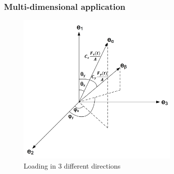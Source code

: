 \documentclass[xcolor=table]{Bredelebeamer}
\begin{document}
\begin{frame}
	\frametitle{Multi-dimensional application}
  \begin{figure}[!h]
  	\centering
  	\includegraphics[width=0.7\textwidth]{figures//xab.png} 
  	\caption{Loading in 3 different directions}
  	\label{xab}
  \end{figure}
\end{frame}	
\end{document}
